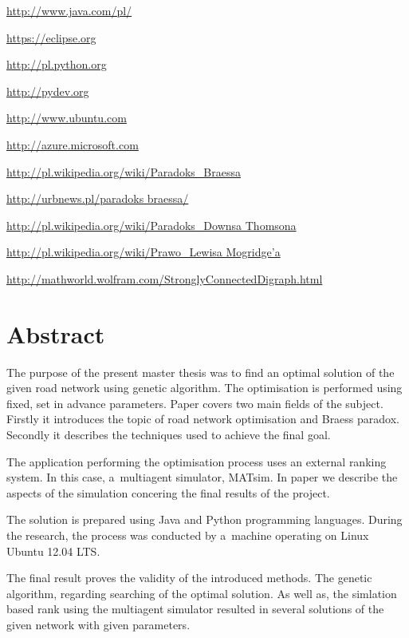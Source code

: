\documentclass[twoside,12pt]{report}
\let\oldsection\chapter
\def\chapter{\cleardoublepage\oldsection}
\begin{document}
\begin{thebibliography}{99}
	\url{http://www.java.com/pl/}

	\url{https://eclipse.org}
				
	\url{http://pl.python.org}
	
	\url{http://pydev.org}
	
	\url{http://www.ubuntu.com}
	
	\url{http://azure.microsoft.com}
			
	\url{http://pl.wikipedia.org/wiki/Paradoks_Braessa}
	
	\url{http://urbnews.pl/paradoks braessa/}
	
	\url{http://pl.wikipedia.org/wiki/Paradoks_Downsa Thomsona}
	
	\href{http://pl.wikipedia.org/wiki/Prawo_Lewisa Mogridge\%E2\%80\%99a}
	    {http://pl.wikipedia.org/wiki/Prawo\_Lewisa Mogridge\textquoteright{}a}
	   
	\url{http://mathworld.wolfram.com/StronglyConnectedDigraph.html}

\end{thebibliography}

\clearpage
{}
{}
\chapter*{Abstract}

The purpose of the present master thesis was to find an optimal solution of the given road network using genetic algorithm. The optimisation is performed using fixed, set in advance parameters. Paper covers two main fields of the subject. Firstly it introduces the topic of road network optimisation and Braess paradox. Secondly it describes the techniques used to achieve the final goal.

The application performing the optimisation process uses an external ranking system. In this case, a~multiagent simulator, MATsim. In paper we describe the aspects of the simulation concering the final results of the project. 

The solution is prepared using Java and Python programming languages. During the research, the process was conducted by a~machine operating on Linux Ubuntu 12.04 LTS.

The final result proves the validity of the introduced methods. The genetic algorithm, regarding searching of the optimal solution. As well as, the simlation based rank using the multiagent  simulator resulted in several solutions of the given network with given parameters.
\end{document}
